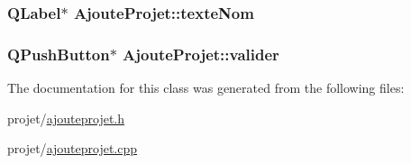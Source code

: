 \subsubsection[{texte\+Nom}]{\setlength{\rightskip}{0pt plus 5cm}Q\+Label$\ast$ Ajoute\+Projet\+::texte\+Nom}\label{class_ajoute_projet_a39443276944c00ca6c510c3c0da60c5d}
\hypertarget{class_ajoute_projet_ab285625086a180004e0015c465b9a61a}{}
\subsubsection[{valider}]{\setlength{\rightskip}{0pt plus 5cm}Q\+Push\+Button$\ast$ Ajoute\+Projet\+::valider}\label{class_ajoute_projet_ab285625086a180004e0015c465b9a61a}


The documentation for this class was generated from the following files\+:\begin{DoxyCompactItemize}
\item 
projet/\hyperlink{ajouteprojet_8h}{ajouteprojet.\+h}\item 
projet/\hyperlink{ajouteprojet_8cpp}{ajouteprojet.\+cpp}\end{DoxyCompactItemize}
